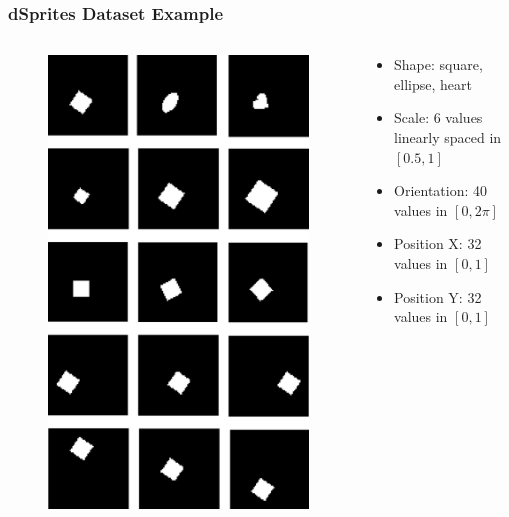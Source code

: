 \documentclass[10pt,mathserif]{beamer}
\begin{document}
\begin{frame}
\frametitle{dSprites Dataset Example}
\begin{columns}
\begin{column}{0.35\textwidth}
\begin{figure}
\includegraphics[width=\linewidth]{dsprites}
\end{figure}
\end{column}
\begin{column}{0.65\textwidth}
\begin{itemize}\itemsep=26pt
\item Shape: square, ellipse, heart
\item Scale: 6 values linearly spaced in $[0.5, 1]$
\item Orientation: 40 values in $[0, 2\pi]$
\item Position X: 32 values in $[0, 1]$
\item Position Y: 32 values in $[0, 1]$

\end{itemize}
\end{column}
\end{columns}

\end{frame}
\end{document}

